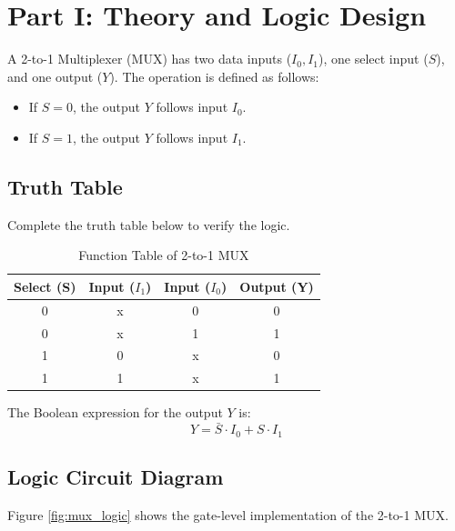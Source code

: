 \documentclass{article}
\begin{document}
\section*{Part I: Theory and Logic Design}

A 2-to-1 Multiplexer (MUX) has two data inputs ($I_0, I_1$), one select input ($S$), and one output ($Y$). The operation is defined as follows:
\begin{itemize}
    \item If $S = 0$, the output $Y$ follows input $I_0$.
    \item If $S = 1$, the output $Y$ follows input $I_1$.
\end{itemize}

\subsection*{Truth Table}
Complete the truth table below to verify the logic.

\begin{table}[H]
    \centering
    \begin{tabular}{|c|c|c|c|}
        \hline
        \textbf{Select (S)} & \textbf{Input ($I_1$)} & \textbf{Input ($I_0$)} & \textbf{Output (Y)} \\
        \hline
        0 & x & 0 & 0 \\
        0 & x & 1 & 1 \\
        1 & 0 & x & 0 \\
        1 & 1 & x & 1 \\
        \hline
    \end{tabular}
    \caption{Function Table of 2-to-1 MUX}
    \label{tab:mux_truth}
\end{table}

The Boolean expression for the output $Y$ is:
\[ Y = \bar{S} \cdot I_0 + S \cdot I_1 \]

\subsection*{Logic Circuit Diagram}
Figure \ref{fig:mux_logic} shows the gate-level implementation of the 2-to-1 MUX.
\end{document}
